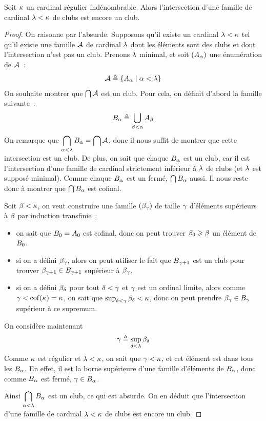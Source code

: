 \begin{proposition}\label{prop.inter.club.k}
  Soit $\kappa$ un cardinal régulier indénombrable. Alors l'intersection d'une
  famille de cardinal $\lambda < \kappa$ de clubs est encore un club.
\end{proposition}

\begin{proof}
  On raisonne par l'absurde. Supposons qu'il existe un cardinal
  $\lambda < \kappa$ tel qu'il existe une famille $\mathcal A$ de cardinal
  $\lambda$ dont les éléments sont des clubs et dont l'intersection n'est pas
  un club. Prenons $\lambda$ minimal, et soit $(A_\alpha)$ une énumération
  de $\mathcal A$~:
  \[\mathcal A \triangleq \left\{ A_\alpha \;\middle\vert\; \alpha < \lambda \right\}\]
  On souhaite montrer que $\bigcap \mathcal A$ est un club. Pour cela, on
  définit d'abord la famille suivante~:
  \[B_\alpha \triangleq \bigcup_{\beta < \alpha} A_\beta\]
  On remarque que
  $\displaystyle\bigcap_{\alpha < \lambda} B_\alpha = \bigcap\mathcal A$, donc il
  nous suffit de montrer que cette intersection est un club. De plus, on sait
  que chaque $B_\alpha$ est un club, car il est l'intersection
  d'une famille de cardinal strictement inférieur à $\lambda$ de clubs (et
  $\lambda$ est supposé minimal). Comme chaque $B_\alpha$ est un fermé,
  $\bigcap B_\alpha$ aussi. Il nous reste donc à montrer que
  $\bigcap B_\alpha$ est cofinal.

  Soit $\beta < \kappa$, on veut construire une famille $(\beta_\gamma)$ de
  taille $\gamma$ d'éléments supérieurs à $\beta$ par induction transfinie~:
  \begin{itemize}
  \item on sait que $B_0 = A_0$ est cofinal, donc on peut trouver
    $\beta_0 \geqslant \beta$ un élément de $B_0$.
  \item si on a défini $\beta_\gamma$, alors on peut utiliser le fait que
    $B_{\gamma + 1}$ est un club pour trouver
    $\beta_{\gamma + 1}\in B_{\gamma+ 1}$ supérieur à $\beta_\gamma$.
  \item si on a défini $\beta_\delta$ pour tout $\delta < \gamma$ et $\gamma$
    est un ordinal limite, alors comme $\gamma < \operatorname{cof}(\kappa) = \kappa$, on
    sait que $\sup_{\delta < \gamma} \beta_\delta < \kappa$, donc on peut prendre
    $\beta_\gamma \in B_\gamma$ supérieur à ce supremum.
  \end{itemize}
  On considère maintenant
  \[\gamma \triangleq \sup_{\delta < \lambda} \beta_\delta\]
  Comme $\kappa$ est régulier et $\lambda < \kappa$, on sait que
  $\gamma < \kappa$, et cet élément est dans tous les $B_\alpha$. En effet,
  il est la borne supérieure d'une famille d'éléments de $B_\alpha$, donc
  comme $B_\alpha$ est fermé, $\gamma \in B_\alpha$.

  Ainsi $\displaystyle\bigcap_{\alpha < \lambda} B_\alpha$ est un club, ce qui
  est absurde. On en déduit que l'intersection d'une famille de cardinal
  $\lambda < \kappa$ de clubs est encore un club.
\end{proof}

